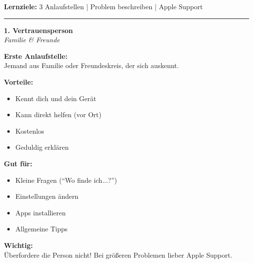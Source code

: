 \documentclass[a4paper,landscape,8pt]{extarticle}
\begin{document}

 \hfill
{\footnotesize\textbf{Lernziele:} 3 Anlaufstellen | Problem beschreiben | Apple Support}

\vspace{1mm}
\hrule
\vspace{1mm}

\begin{minipage}[t]{0.32\linewidth}
\begin{center}
\colorbox{familygreen!15}{%
\begin{minipage}{0.95\linewidth}
\vspace{2mm}
\begin{center}
{\Large\bfseries\textcolor{familygreen}{1. Vertrauensperson}}\\[1pt]
{\footnotesize\itshape Familie \& Freunde}
\end{center}
\vspace{2mm}
\end{minipage}%
}
\end{center}

\vspace{1mm}

\textbf{Erste Anlaufstelle:}\\
Jemand aus Familie oder Freundeskreis, der sich auskennt.

\textbf{Vorteile:}
\begin{itemize}
\item Kennt dich und dein Gerät
\item Kann direkt helfen (vor Ort)
\item Kostenlos
\item Geduldig erklären
\end{itemize}

\textbf{Gut für:}
\begin{itemize}
\item Kleine Fragen (``Wo finde ich...?'')
\item Einstellungen ändern
\item Apps installieren
\item Allgemeine Tipps
\end{itemize}

\vspace{2mm}

\vspace{2mm}

\textbf{Wichtig:}\\
Überfordere die Person nicht! Bei größeren Problemen lieber Apple Support.

\end{minipage}%
\end{document}
